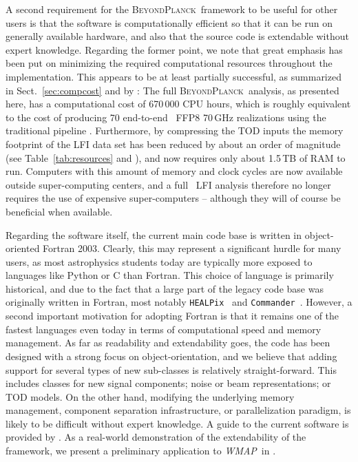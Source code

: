 \documentclass[twocolumn]{aa}
\def\WMAP{\emph{WMAP}}
\def\commander{\texttt{Commander}}
\newcommand{\BP}{\textsc{BeyondPlanck}}
\newcommand{\HEALPix}[0]{\texttt{HEALPix}}
\begin{document}
A second requirement for the \BP\ framework to be useful for other
users is that the software is computationally efficient so that it can
be run on generally available hardware, and also that the source code
is extendable without expert knowledge. Regarding the former point, we
note that great emphasis has been put on minimizing the required
computational resources throughout the implementation. This appears to
be at least partially successful, as summarized in
Sect.~\ref{sec:compcost} and by \citet{bp03}: The full \BP\ analysis,
as presented here, has a computational cost of 670\,000 CPU hours,
which is roughly equivalent to the cost of producing 70 end-to-end
\Planck\ FFP8 70\,GHz realizations using the traditional pipeline
\citep{planck2014-a14}. Furthermore, by compressing the TOD inputs the
memory footprint of the LFI data set has been reduced by about an
order of magnitude (see Table~\ref{tab:resources} and \citealp{bp03}),
and now requires only about 1.5\,TB of RAM to run. Computers with this
amount of memory and clock cycles are now available outside
super-computing centers, and a full \Planck\ LFI analysis therefore no
longer requires the use of expensive super-computers -- although they
will of course be beneficial when available.

Regarding the software itself, the current main code base is written
in object-oriented Fortran 2003. Clearly, this may represent a
significant hurdle for many users, as most astrophysics students today
are typically more exposed to languages like Python or C than
Fortran. This choice of language is primarily historical, and due to
the fact that a large part of the legacy code base was originally
written in Fortran, most notably \HEALPix\ \citep{gorski2005} and
\commander\ \citep{eriksen:2004,eriksen2008}. However, a second
important motivation for adopting Fortran is that it remains one of
the fastest languages even today in terms of computational speed
and memory management. As far as readability and extendability goes,
the code has been designed with a strong focus on object-orientation,
and we believe that adding support for several types of new
sub-classes is relatively straight-forward. This includes classes for
new signal components; noise or beam representations; or TOD
models. On the other hand, modifying the underlying memory management,
component separation infrastructure, or parallelization paradigm, is
likely to be difficult without expert knowledge. A guide to the
current software is provided by \citet{bp03}. As a real-world
demonstration of the extendability of the framework, we present
a preliminary application to \WMAP\ in \citep{bp17}.
\end{document}
